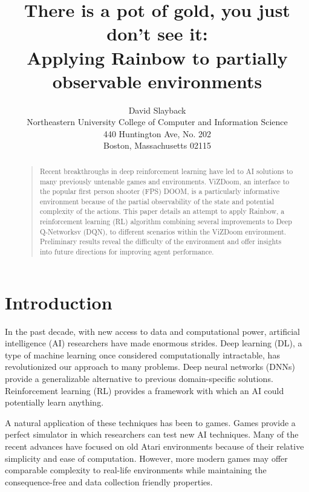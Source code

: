 \documentclass[letterpaper]{article}
\begin{document}
	\title{There is a pot of gold, you just don't see it: \\ Applying Rainbow to partially observable environments}
	\author{David Slayback\\
		Northeastern University College of Computer and Information Science\\
		440 Huntington Ave, No. 202\\
		Boston, Massachusetts 02115\\
	}
	\maketitle
	\begin{abstract}
		\begin{quote}
			Recent breakthroughs in deep reinforcement learning have led to AI solutions to many previously untenable games and environments. ViZDoom, an interface to the popular first person shooter (FPS) DOOM, is a particularly informative environment because of the partial observability of the state and potential complexity of the actions. This paper details an attempt to apply Rainbow, a reinforcement learning (RL) algorithm combining several improvements to Deep Q-Networksv (DQN), to different scenarios within the ViZDoom environment. Preliminary results reveal the difficulty of the environment and offer insights into future directions for improving agent performance.
		\end{quote}
	\end{abstract} 
	
	\section{Introduction}
	
	In the past decade, with new access to data and computational power, artificial intelligence (AI) researchers have made enormous strides. Deep learning (DL), a type of machine learning once considered computationally intractable, has revolutionized our approach to many problems. Deep neural networks (DNNs) provide a generalizable alternative to previous domain-specific solutions. Reinforcement learning (RL) provides a framework with which an AI could potentially learn anything.
	
	A natural application of these techniques has been to games. Games provide a perfect simulator in which researchers can test new AI techniques. Many of the recent advances have focused on old Atari environments because of their relative simplicity and ease of computation. However, more modern games may offer comparable complexity to real-life environments while maintaining the consequence-free and data collection friendly properties. 
	
\end{document}
